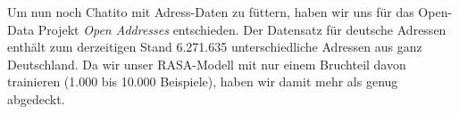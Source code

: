 Um nun noch Chatito mit Adress-Daten zu füttern, haben wir uns für das Open-Data Projekt \textit{Open Addresses} entschieden. Der Datensatz für deutsche Adressen enthält zum derzeitigen Stand 6.271.635 unterschiedliche Adressen aus ganz Deutschland. Da wir unser RASA-Modell mit nur einem Bruchteil davon trainieren (1.000 bis 10.000 Beispiele), haben wir damit mehr als genug abgedeckt.
